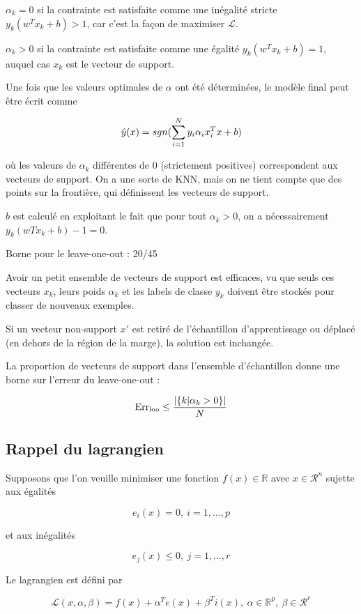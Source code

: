 	$\alpha_k = 0$ si la contrainte est satisfaite comme une inégalité stricte $y_k (w^T x_k + b) > 1$, car c'est la façon de maximiser $\mathcal{L}$.
	
	$\alpha_k > 0$ si la contrainte est satisfaite comme une égalité $y_k(w^Tx_k + b) = 1$, auquel cas $x_k$ est le vecteur de support.
	
	Une fois que les valeurs optimales de $\alpha$ ont été déterminées, le modèle final peut être écrit comme
	
	$$\hat{y}(x) = sgn(\sum_{i= 1}^N y_i \alpha_i x_i^T x + b)$$
	
	où les valeurs de $\alpha_k$ différentes de 0 (strictement positives) correspondent aux vecteurs de support. On a une sorte de KNN, mais on ne tient compte que des points sur la frontière, qui définissent les vecteurs de support.
	
	$b$ est calculé en exploitant le fait que pour tout $\alpha_k > 0$, on a nécessairement $y_k(wTx_k + b) - 1 = 0$.
	
	Borne pour le leave-one-out : 20/45
	
	Avoir un petit ensemble de vecteurs de support est efficaces, vu que seuls ces vecteurs $x_k$, leurs poids $\alpha_k$ et les labels de classe $y_k$ doivent être stockés pour classer de nouveaux exemples.
	
	Si un vecteur non-support $x'$ est retiré de l'échantillon d'apprentissage ou déplacé (en dehors de la région de la marge), la solution est inchangée.
	
	La proportion de vecteurs de support dans l'ensemble d'échantillon donne une borne sur l'erreur du leave-one-out :
	
	$$\text{Err}_\text{loo} \leq \frac{\vert \lbrace k \vert \alpha_k > 0 \rbrace \vert}{N}$$
	
	\subsection{Rappel du lagrangien}
	
	Supposons que l'on veuille minimiser une fonction $f(x) \in \mathbb{R}$ avec $x \in \mathcal{R}^n$ sujette aux égalités
	
	$$e_i(x) = 0, \: i = 1, \dots , p$$
	
	et aux inégalités
	
	$$e_j(x) \leq 0, \: j = 1, \dots , r$$
	
	Le lagrangien est défini par
	
	$$\mathcal{L}(x, \alpha, \beta) = f(x) + \alpha^T e(x) + \beta^T i(x), \: \alpha \in \mathbb{R}^p, \: \beta \in \mathcal{R}^r$$
	
